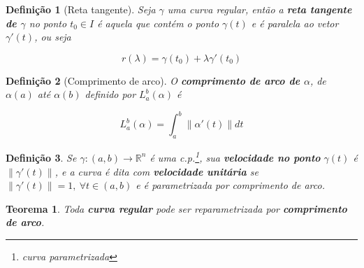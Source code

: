 \documentclass{article}
\newtheorem{theorem}{Teorema}
\newtheorem{definition}{Definição}
\begin{document}
\begin{definition}[Reta tangente]
Seja $\gamma$ uma curva regular, então a \textbf{reta tangente de $\gamma$} no ponto $t_0 \in I$ é aquela que contém o ponto $\gamma(t)$ e é paralela ao vetor $\gamma'(t)$, ou seja

$$r(\lambda) = \gamma(t_0) + \lambda \gamma'(t_0)$$
\end{definition}

\begin{definition}[Comprimento de arco]
O \textbf{comprimento de arco de $\alpha$}, de $\alpha(a)$ até $\alpha(b)$ definido por $L_a^b (\alpha)$ é  

$$L_a^b (\alpha) = \int_a^b \| \alpha'(t) \| d t$$
\end{definition}

\begin{definition}
Se $\gamma: (a, b) \rightarrow \mathbb{R}^n$ é uma c.p.\footnote{curva parametrizada}, sua \textbf{velocidade no ponto} $\gamma(t)$ é $\| \gamma'(t) \|$, e a curva é dita com \textbf{velocidade unitária} se $\| \gamma'(t) \| = 1,\ \forall t \in (a, b)$ e é parametrizada por comprimento de arco.
\end{definition}

\begin{theorem}
Toda \textbf{curva regular} pode ser reparametrizada por \textbf{comprimento de arco}.
\end{theorem}
\end{document}
